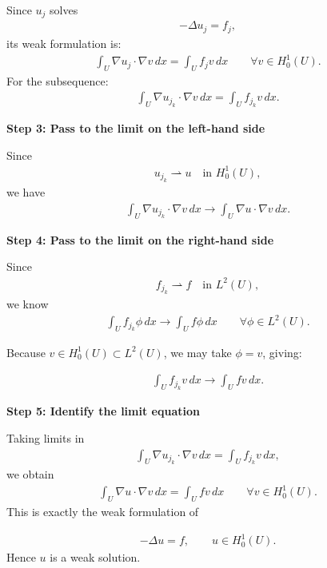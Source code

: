 \documentclass[12pt,a4paper]{report}
\begin{document}
\begin{description}
\begin{description}
Since $u_j$ solves
\begin{align*}
-\Delta u_j=f_j,
\end{align*}
its weak formulation is:
\begin{align*}
\int_U \nabla u_j\cdot\nabla v\,dx = \int_U f_jv\,dx \qquad\forall v\in H_0^1(U).
\end{align*}
For the subsequence:
\begin{align*}
\int_U \nabla u_{j_k}\cdot\nabla v\,dx = \int_U f_{j_k}v\,dx.
\end{align*}

\item \textbf{Step 3: Pass to the limit on the left-hand side}

Since
\begin{align*}
u_{j_k}\rightharpoonup u
\quad\text{in }H_0^1(U),
\end{align*}
we have
\begin{align*}
\int_U \nabla u_{j_k}\cdot\nabla v\,dx \to \int_U \nabla u\cdot\nabla v\,dx.
\end{align*}

\item \textbf{Step 4: Pass to the limit on the right-hand side}

Since
\begin{align*}
f_{j_k}\rightharpoonup f
\quad\text{in }L^2(U),
\end{align*}
we know
\begin{align*}
\int_U f_{j_k}\phi\,dx \to \int_U f\phi\,dx \qquad\forall \phi\in L^2(U).
\end{align*}

Because $v\in H_0^1(U)\subset L^2(U)$, we may take $\phi=v$, giving:

\begin{align*}
\int_U f_{j_k}v\,dx \to \int_U fv\,dx.
\end{align*}

\item \textbf{Step 5: Identify the limit equation}

Taking limits in
\begin{align*}
\int_U \nabla u_{j_k}\cdot\nabla v\,dx = \int_U f_{j_k}v\,dx,
\end{align*}
we obtain
\begin{align*}
\int_U \nabla u\cdot\nabla v\,dx = \int_U fv\,dx \qquad\forall v\in H_0^1(U).
\end{align*}
This is exactly the weak formulation of

\begin{align*}
-\Delta u=f,\qquad u\in H_0^1(U).
\end{align*}
Hence $u$ is a weak solution.


\end{description}
\end{description}
\end{document}
